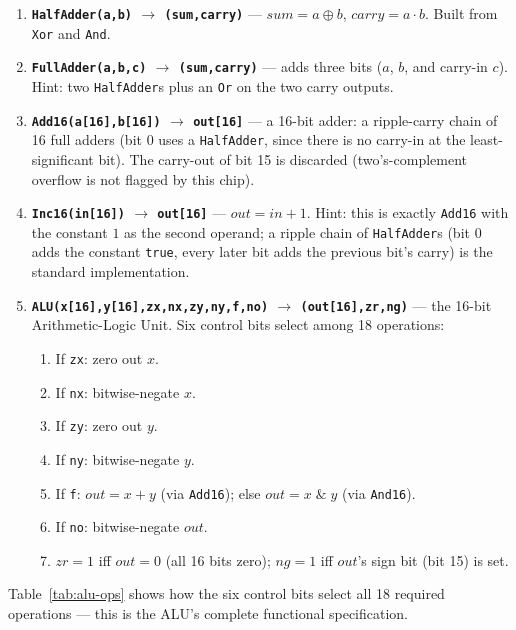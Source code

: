 \documentclass[11pt]{article}
\begin{document}
\begin{enumerate}
  \item \textbf{\texttt{HalfAdder(a,b)} $\to$ \texttt{(sum,carry)}} --- $sum = a\oplus b$, $carry = a\cdot b$. Built from \texttt{Xor} and \texttt{And}.
  \item \textbf{\texttt{FullAdder(a,b,c)} $\to$ \texttt{(sum,carry)}} --- adds three bits ($a$, $b$, and carry-in $c$). Hint: two \texttt{HalfAdder}s plus an \texttt{Or} on the two carry outputs.
  \item \textbf{\texttt{Add16(a[16],b[16])} $\to$ \texttt{out[16]}} --- a 16-bit adder: a ripple-carry chain of 16 full adders (bit 0 uses a \texttt{HalfAdder}, since there is no carry-in at the least-significant bit). The carry-out of bit 15 is discarded (two's-complement overflow is not flagged by this chip).
  \item \textbf{\texttt{Inc16(in[16])} $\to$ \texttt{out[16]}} --- $out = in + 1$. Hint: this is exactly \texttt{Add16} with the constant $1$ as the second operand; a ripple chain of \texttt{HalfAdder}s (bit 0 adds the constant \texttt{true}, every later bit adds the previous bit's carry) is the standard implementation.
  \item \textbf{\texttt{ALU(x[16],y[16],zx,nx,zy,ny,f,no)} $\to$ \texttt{(out[16],zr,ng)}} --- the 16-bit Arithmetic-Logic Unit. Six control bits select among 18 operations:
  \begin{enumerate}
    \item If \texttt{zx}: zero out $x$.
    \item If \texttt{nx}: bitwise-negate $x$.
    \item If \texttt{zy}: zero out $y$.
    \item If \texttt{ny}: bitwise-negate $y$.
    \item If \texttt{f}: $out = x + y$ (via \texttt{Add16}); else $out = x \;\&\; y$ (via \texttt{And16}).
    \item If \texttt{no}: bitwise-negate $out$.
    \item $zr = 1$ iff $out = 0$ (all 16 bits zero); $ng = 1$ iff $out$'s sign bit (bit 15) is set.
  \end{enumerate}
\end{enumerate}

\noindent Table~\ref{tab:alu-ops} shows how the six control bits select all 18 required operations --- this is the ALU's complete functional specification.
\end{document}
